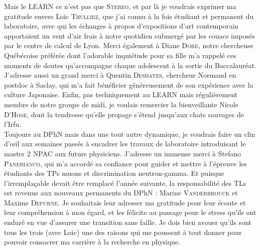 Mais le LEARN ce n'est pas que \textsc{Stereo}, et par là je voudrais exprimer ma gratitude envers Loïc \textsc{Thulliez}, que j'ai connu à la fois étudiant et permanent du laboratoire, avec qui les échanges à propos d'expositions d'art contemporain apportaient un vent d'air frais à notre quotidien submergé par les couacs imposés par le centre de calcul de Lyon. Merci également à Diane \textsc{Dore}, notre chercheuse Québécoise préférée dont l'adorable inquiétude pour sa fille m'a rappelé ces moments de doutes qu'accompagne chaque adolescent à la sortie du Baccalauréat. J'adresse aussi un grand merci à Quentin \textsc{Deshayes}, chercheur Normand en postdoc à Saclay, qui m'a fait bénéficier généreusement de son expérience avec la culture Japonaise. Enfin, pas techniquement au LEARN mais régulièrement membre de notre groupe de midi, je voulais remercier la bienveillante Nicole \textsc{D'Hose}, dont la tendresse qu'elle propage s'étend jusqu'aux chats sauvages de l'Irfu.\\

Toujours au DPhN mais dans une tout autre dynamique, je voudrais faire un clin d'\oe il aux semaines passés à encadrer les travaux de laboratoire introduisant le master 2 NPAC aux futurs physiciens. J'adresse un immense merci à Stefano \textsc{Panebianco}, qui m'a accordé sa confiance pour guider et mettre à l'épreuve les étudiants des TPs muons et discrimination neutron-gamma. Et puisque l'irremplaçable devait être remplacé l'année suivante, la responsabilité des TLs est revenue aux nouveaux permanents du DPhN : Marine \textsc{Vanderbrouck} et Maxime \textsc{Defurne}. Je souhaitais leur adresser ma gratitude pour leur écoute et leur compréhension à mon égard, et les félicite au passage pour le stress qu'ils ont enduré en vue d'assurer une transition sans faille. Je dois bien avouer qu'ils sont tous les trois (avec Loïc) une des raisons qui me poussent à tout donner pour pouvoir consacrer ma carrière à la recherche en physique.\\

